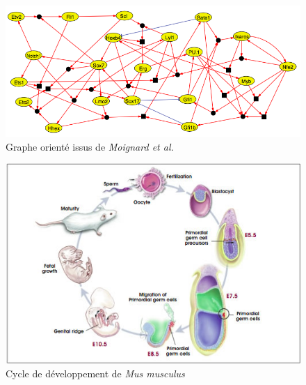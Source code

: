 \documentclass[fleqn,11pt]{SelfArx} %
\begin{document}
\begin{figure}[ht]
\centering
\includegraphics[width=\linewidth]{images/article3}
\caption{Graphe orienté issus de \textit{Moignard et al.}}
\label{fig:artcile2}
\end{figure}

\begin{figure}[ht]
\centering
\includegraphics[width=\linewidth]{images/devptCycle}
\caption{Cycle de développement de \textit{Mus musculus}}
\label{fig:devptCycle}
\end{figure}
\end{document}
